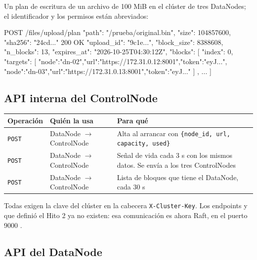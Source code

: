 \documentclass[10pt]{article}
\begin{document}
Un plan de escritura de un archivo de 100 MiB en el clúster de tres DataNodes; el identificador y los permisos están abreviados:

\begin{codigo}
POST /files/upload/plan  { "path": "/prueba/original.bin", "size": 104857600, "sha256": "24cd..." }
200 OK
{ "upload_id": "9c1e...", "block_size": 8388608, "n_blocks": 13,
  "expires_at": "2026-10-25T04:30:12Z",
  "blocks": [
    { "index": 0, "targets": [ {"node":"dn-02","url":"https://172.31.0.12:8001","token":"eyJ..."},
                               {"node":"dn-03","url":"https://172.31.0.13:8001","token":"eyJ..."} ] },
    ... ] }
\end{codigo}

\subsection{API interna del ControlNode}

\begin{xltabular}{\linewidth}{@{}L{4.2cm}L{3.2cm}Y@{}}
\toprule
Operación & Quién la usa & Para qué \\
\midrule\endhead
\texttt{POST}  & DataNode $\rightarrow$ ControlNode & Alta al arrancar con \texttt{\{node\_id, url, capacity, used\}} \\
\texttt{POST}  & DataNode $\rightarrow$ ControlNode & Señal de vida cada 3 s con los mismos datos. Se envía a los tres ControlNodes \\
\texttt{POST}  & DataNode $\rightarrow$ ControlNode & Lista de bloques que tiene el DataNode, cada 30 s \\
\bottomrule
\end{xltabular}

Todas exigen la clave del clúster en la cabecera \texttt{X-Cluster-Key}. Los endpoints  y  que definió el Hito 2 ya no existen: esa comunicación es ahora Raft, en el puerto 9000 .

\subsection{API del DataNode}
\end{document}
